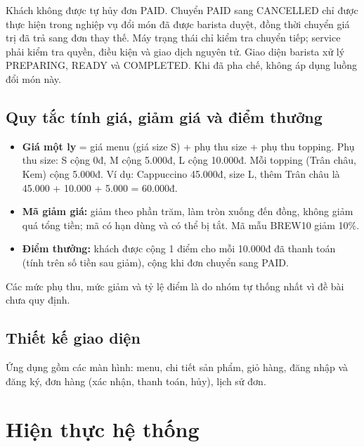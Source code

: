 \documentclass[a4paper]{article}
\newcommand{\hinh}[1]{\begin{center}\fbox{\parbox{0.85\linewidth}{\centering\vspace{1.1cm}%
	\textcolor{red}{[Chèn hình: #1]}\vspace{1.1cm}}}\end{center}}
\begin{document}
Khách không được tự hủy đơn PAID. Chuyển PAID sang CANCELLED chỉ được thực hiện trong nghiệp vụ đổi món đã được barista duyệt, đồng thời chuyển giá trị đã trả sang đơn thay thế. Máy trạng thái chỉ kiểm tra chuyển tiếp; service phải kiểm tra quyền, điều kiện và giao dịch nguyên tử. Giao diện barista xử lý PREPARING, READY và COMPLETED. Khi đã pha chế, không áp dụng luồng đổi món này.

\subsection{Quy tắc tính giá, giảm giá và điểm thưởng}
\begin{itemize}
	\item \textbf{Giá một ly} = giá menu (giá size S) + phụ thu size + phụ thu topping. Phụ thu size: S cộng 0đ, M cộng 5.000đ, L cộng 10.000đ. Mỗi topping (Trân châu, Kem) cộng 5.000đ. Ví dụ: Cappuccino 45.000đ, size L, thêm Trân châu là 45.000 + 10.000 + 5.000 = 60.000đ.
	\item \textbf{Mã giảm giá:} giảm theo phần trăm, làm tròn xuống đến đồng, không giảm quá tổng tiền; mã có hạn dùng và có thể bị tắt. Mã mẫu BREW10 giảm 10\%.
	\item \textbf{Điểm thưởng:} khách được cộng 1 điểm cho mỗi 10.000đ đã thanh toán (tính trên số tiền sau giảm), cộng khi đơn chuyển sang PAID.
\end{itemize}
Các mức phụ thu, mức giảm và tỷ lệ điểm là do nhóm tự thống nhất vì đề bài chưa quy định.





\subsection{Thiết kế giao diện}
Ứng dụng gồm các màn hình: menu, chi tiết sản phẩm, giỏ hàng, đăng nhập và đăng ký, đơn hàng (xác nhận, thanh toán, hủy), lịch sử đơn.

\hinh{Màn hình Menu}
\hinh{Màn hình Chi tiết sản phẩm (chọn size, topping)}
\hinh{Màn hình Giỏ hàng (có ô nhập mã giảm giá)}
\hinh{Màn hình Đơn hàng (thanh toán và hủy đơn)}
\hinh{Màn hình Lịch sử đơn hàng}

\newpage
\section{Hiện thực hệ thống}
\end{document}
